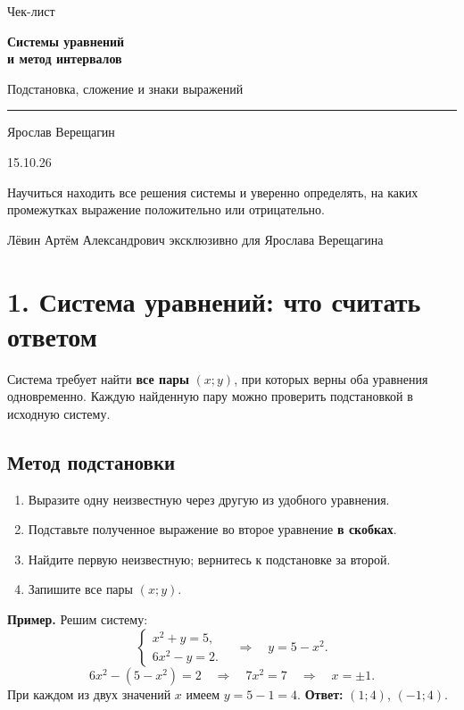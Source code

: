 \documentclass[a4paper,12pt]{article}
\newcommand{\key}[1]{{\color{darkaccent}\textbf{#1}}}
\newcommand{\headsec}[1]{\section*{\color{darkaccent}#1}\vspace{-6pt}{\color{hairline}\rule{\linewidth}{0.55pt}}\par\vspace{1pt}}
\newcommand{\headsub}[1]{\subsection*{\color{accent}#1}\vspace{-4pt}}
\begin{document}
\hypersetup{pageanchor=false}
\begin{titlepage}
\thispagestyle{empty}
\centering
\vspace*{29mm}
{\large\color{quiet}Чек-лист}\par
\vspace{8mm}
{\fontsize{29}{35}\selectfont\bfseries\color{darkaccent}
Системы уравнений\\[2mm]и метод интервалов}\par
\vspace{8mm}
{\Large\color{accent}Подстановка, сложение и знаки выражений}\par
\vspace{17mm}
{\color{hairline}\rule{0.76\linewidth}{0.7pt}}\par
\vspace{10mm}
{\large Ярослав Верещагин}\par
\vspace{3mm}
{\normalsize 15.10.26}\par
\vfill
\begin{minipage}{0.87\linewidth}
\centering\normalsize
Научиться находить все решения системы и уверенно определять,
на каких промежутках выражение положительно или отрицательно.
\end{minipage}
\vspace{13mm}
\par
\vspace{9mm}
{\small\color{quiet}Лёвин Артём Александрович эксклюзивно для Ярослава Верещагина}
\end{titlepage}
\hypersetup{pageanchor=true}

\headsec{1. Система уравнений: что считать ответом}
Система требует найти \key{все пары} \((x;y)\), при которых верны оба уравнения одновременно.
Каждую найденную пару можно проверить подстановкой в исходную систему.

\headsub{Метод подстановки}
\begin{enumerate}
\item Выразите одну неизвестную через другую из удобного уравнения.
\item Подставьте полученное выражение во второе уравнение \key{в скобках}.
\item Найдите первую неизвестную; вернитесь к подстановке за второй.
\item Запишите все пары \((x;y)\).
\end{enumerate}
\key{Пример.} Решим систему:
\[
\begin{cases}
x^2+y=5,\\
6x^2-y=2.
\end{cases}
\quad\Longrightarrow\quad y=5-x^2.
\]
\[
6x^2-(5-x^2)=2\quad\Longrightarrow\quad 7x^2=7
\quad\Longrightarrow\quad x=\pm1.
\]
При каждом из двух значений \(x\) имеем \(y=5-1=4\).
\key{Ответ:} \((1;4)\), \((-1;4)\).
\end{document}

